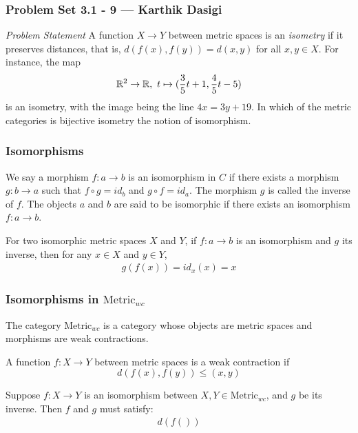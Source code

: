 
\begin{frame}
    \frametitle{Problem Set 3.1 - 9 --- Karthik Dasigi}
    \emph{Problem Statement}
    A function \(X\rightarrow Y\) between metric spaces is an \textit{isometry} if 
    it preserves distances, that is, \(d(f(x),f(y))=d(x,y)\) for all \(x,y \in X\).
    For instance, the map
    \begin{equation}
        \mathbb{R}^2 \rightarrow \mathbb{R} , \text{    } t \mapsto (\frac{3}{5}t+1, \frac{4}{5}t -5)
    \end{equation}
    is an isometry, with the image being the line \(4x =3y + 19\). 
    In which of the metric categories is bijective isometry the notion of isomorphism.
\end{frame}

\begin{frame}
    \frametitle{Isomorphisms}
    \begin{definition}[Isomorphism]
        We say a morphism \(f : a \rightarrow b\) is an isomorphism in \(C\) if there exists a morphism
        \(g : b \rightarrow a\) such that \(f \circ g = id_b\) and \(g \circ f = id_a\). The morphism \(g\) is called the inverse
        of \(f\). The objects \(a\) and \(b\) are said to be isomorphic if there exists an isomorphism \(f:a\rightarrow b\).
    \end{definition}
    \pause
    For two isomorphic metric spaces \(X\) and \(Y\), if \(f:a\rightarrow b\) is an isomorphism and \(g\) its inverse,
    then for any \(x\in X\) and \(y\in Y\),
    \begin{gather}
        g(f(x))=id_x(x)=x 
    \end{gather}
    
\end{frame}

\begin{frame}
    \frametitle{Isomorphisms in \(\text{Metric}_{wc}\)}
    The category \(\text{Metric}_{wc}\) is a category whose objects are metric spaces and morphisms are weak contractions.
    \pause
    \begin{definition}
        A function \(f : X \rightarrow Y\) between metric spaces is a
        weak contraction if
        \begin{equation}
            d(f(x),f(y))\leq (x,y)
        \end{equation}
    \end{definition}

\end{frame}

\begin{frame}
    Suppose \(f:X\rightarrow Y\) is an isomorphism between \(X,Y\in \text{Metric}_{wc}\), and \(g\) be its inverse. Then \(f\) and \(g\) must satisfy:
    \begin{gather}
        d(f())
    \end{gather}


    

\end{frame}